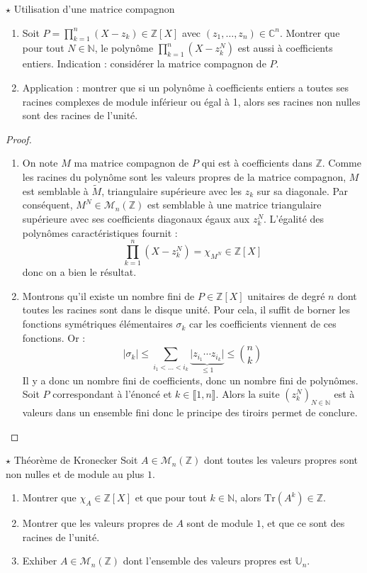 \documentclass[french,a4paper]{article}
\newcommand{\N}{\mathbb{N}}
\newcommand{\Z}{\mathbb{Z}}
\newcommand{\C}{\mathbb{C}}
\newcommand{\U}{\mathbb{U}}
\newcommand{\Tr}{\text{Tr}}
\theoremstyle{plain}
\theoremstyle{definition}
\theoremstyle{remark}
\begin{document}
\begin{ex}{$\star$ Utilisation d'une matrice compagnon}
	\begin{enumerate}
		\item Soit $\displaystyle P=\prod_{k=1}^{n}(X-z_k)\in\Z[X]$ avec $(z_1,\ldots,z_n)\in\C^n$. Montrer que pour tout $N\in\N$, le polynôme $\displaystyle\prod_{k=1}^{n}(X-z_k^N)$ est aussi à coefficients entiers. Indication : considérer la matrice compagnon de $P$.
		\item Application : montrer que si un polynôme à coefficients entiers a toutes ses racines complexes de module inférieur ou égal à 1, alors ses racines non nulles sont des racines de l'unité.
	\end{enumerate}
\end{ex}
\begin{proof}
	\begin{enumerate}
		\item On note $M$ ma matrice compagnon de $P$ qui est à coefficients dans $\Z$. Comme les racines du polynôme sont les valeurs propres de la matrice compagnon, $M$ est semblable à $\tilde{M}$, triangulaire supérieure avec les $z_k$ sur sa diagonale. Par conséquent, $M^N\in\mathcal{M}_n(\Z)$ est semblable à une matrice triangulaire supérieure avec ses coefficients diagonaux égaux aux $z_k^N$. L'égalité des polynômes caractéristiques fournit : $$\prod_{k=1}^{n}(X-z_k^N)=\chi_{M^N}\in\Z[X]$$ donc on a bien le résultat.
		\item Montrons qu'il existe un nombre fini de $P\in\Z[X]$ unitaires de degré $n$ dont toutes les racines sont dans le disque unité. Pour cela, il suffit de borner les fonctions symétriques élémentaires $\sigma_k$ car les coefficients viennent de ces fonctions. Or : $$\lvert\sigma_k\rvert\leqslant\sum_{i_1<\ldots<i_k}\underbrace{\lvert z_{i_1}\cdots z_{i_k}\rvert}_{\leqslant 1}\leqslant\binom{n}{k}$$ Il y a donc un nombre fini de coefficients, donc un nombre fini de polynômes. Soit $P$ correspondant à l'énoncé et $k\in\llbracket1,n\rrbracket$. Alors la suite $(z_k^N)_{N\in\N}$ est à valeurs dans un ensemble fini donc le principe des tiroirs permet de conclure.
	\end{enumerate}
\end{proof}

\begin{ex}[Châteaux]{$\star$ Théorème de Kronecker}
	Soit $A\in\mathcal{M}_n(\Z)$ dont toutes les valeurs propres sont non nulles et de module au plus $1$.
	\begin{enumerate}
		\item Montrer que $\chi_A\in\Z[X]$ et que pour tout $k\in\N$, alors $\Tr(A^k)\in\Z$.
		\item Montrer que les valeurs propres de $A$ sont de module $1$, et que ce sont des racines de l'unité.
		\item Exhiber $A\in\mathcal{M}_n(\Z)$ dont l'ensemble des valeurs propres est $\U_n$.
	\end{enumerate}
\end{ex}
\end{document}
